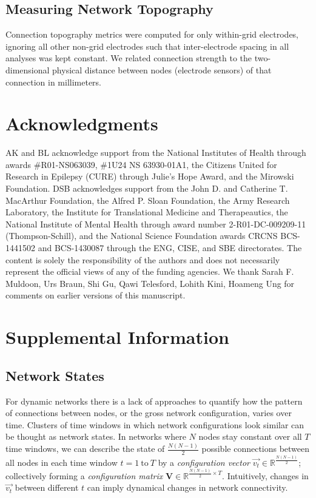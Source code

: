 \subsection{Measuring Network Topography}
Connection topography metrics were computed for only within-grid electrodes, ignoring all other non-grid electrodes such that inter-electrode spacing in all analyses was kept constant. We related connection strength to the two-dimensional physical distance between nodes (electrode sensors) of that connection in millimeters.

\section{Acknowledgments}
    AK and BL acknowledge support from the National Institutes of Health through awards \#R01-NS063039, \#1U24 NS 63930-01A1, the Citizens United for Research in Epilepsy (CURE) through Julie's Hope Award, and the Mirowski Foundation. DSB acknowledges support from the John D. and Catherine T. MacArthur Foundation, the Alfred P. Sloan Foundation, the Army Research Laboratory, the Institute for Translational Medicine and Therapeautics, the National Institute of Mental Health through award number 2-R01-DC-009209-11 (Thompson-Schill), and the National Science Foundation awards CRCNS BCS-1441502 and BCS-1430087 through the ENG, CISE, and SBE directorates. The content is solely the responsibility of the authors and does not necessarily represent the official views of any of the funding agencies. We thank Sarah F. Muldoon, Urs Braun, Shi Gu, Qawi Telesford, Lohith Kini, Hoameng Ung for comments on earlier versions of this manuscript.

\section{Supplemental Information}
\subsection{Network States}
For dynamic networks there is a lack of approaches to quantify how the pattern of connections between nodes, or the gross network configuration, varies over time. Clusters of time windows in which network configurations look similar can be thought as network states. In networks where $N$ nodes stay constant over all $T$ time windows, we can describe the state of $\frac{N(N-1)}{2}$ possible connections between all nodes in each time window $t=1~\mathrm{to}~T$ by a \textit{configuration vector} $\vec{v_{t}} \in \mathbb{R}^{\frac{N(N-1)}{2}}$; collectively forming a \textit{configuration matrix} $\textbf{V} \in \mathbb{R}^{\frac{N(N-1)}{2}\times T}$. Intuitively, changes in $\vec{v_{t}}$ between different $t$ can imply dynamical changes in network connectivity.

